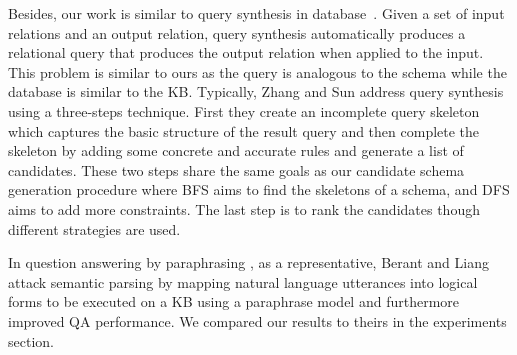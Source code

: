 
Besides, our work is similar to query synthesis in 
database~\cite{niehren2013query,das2010synthesizing,cheung2012inferring,cheung2013optimizing}. 
Given a set of input relations and an output relation,
query synthesis automatically produces a relational query that produces the 
output relation when applied to the input. 
This problem is similar to ours as the query is analogous to the schema
while the database is similar to the KB. 
Typically, Zhang and Sun  
address query synthesis 
using a three-steps technique. First they create an incomplete 
query skeleton which captures the basic structure of the result query 
and then complete the skeleton by adding some concrete and accurate rules 
and generate a list of candidates. 
These two steps share the same goals as our candidate schema generation 
procedure where BFS aims to find the skeletons of a schema,
and DFS aims to add more constraints. 
The last step is to rank the candidates though different strategies are used. 

In question answering by paraphrasing \cite{harabagiu2006methods,berant2013semantic,fader2013paraphrase,kwiatkowski2013scaling,berant2014semantic}, 
as a representative, Berant and Liang~ attack 
semantic parsing by mapping natural language utterances into logical forms 
to be executed on a KB using a paraphrase model and furthermore 
improved QA performance. We compared our results to theirs in the experiments
section. 

